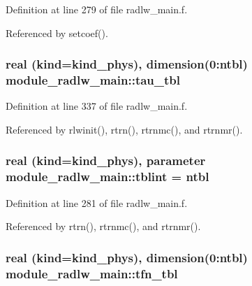 Definition at line 279 of file radlw\+\_\+main.\+f.



Referenced by setcoef().

\subsubsection[{\texorpdfstring{tau\+\_\+tbl}{tau_tbl}}]{\setlength{\rightskip}{0pt plus 5cm}real (kind=kind\+\_\+phys), dimension(0\+:ntbl) module\+\_\+radlw\+\_\+main\+::tau\+\_\+tbl\hspace{0.3cm}{\ttfamily [private]}}\hypertarget{group__module__radlw__main_ga9f73814ee0b1840d8c546ef341645f43}{}\label{group__module__radlw__main_ga9f73814ee0b1840d8c546ef341645f43}


Definition at line 337 of file radlw\+\_\+main.\+f.



Referenced by rlwinit(), rtrn(), rtrnmc(), and rtrnmr().

\subsubsection[{\texorpdfstring{tblint}{tblint}}]{\setlength{\rightskip}{0pt plus 5cm}real (kind=kind\+\_\+phys), parameter module\+\_\+radlw\+\_\+main\+::tblint = ntbl\hspace{0.3cm}{\ttfamily [private]}}\hypertarget{group__module__radlw__main_gaf6b84954042db7b1e2a6abdb4d401ccf}{}\label{group__module__radlw__main_gaf6b84954042db7b1e2a6abdb4d401ccf}


Definition at line 281 of file radlw\+\_\+main.\+f.



Referenced by rtrn(), rtrnmc(), and rtrnmr().

\subsubsection[{\texorpdfstring{tfn\+\_\+tbl}{tfn_tbl}}]{\setlength{\rightskip}{0pt plus 5cm}real (kind=kind\+\_\+phys), dimension(0\+:ntbl) module\+\_\+radlw\+\_\+main\+::tfn\+\_\+tbl\hspace{0.3cm}{\ttfamily [private]}}\hypertarget{group__module__radlw__main_ga71dcfb3c365280e100e180fd1ce939ad}{}\label{group__module__radlw__main_ga71dcfb3c365280e100e180fd1ce939ad}


